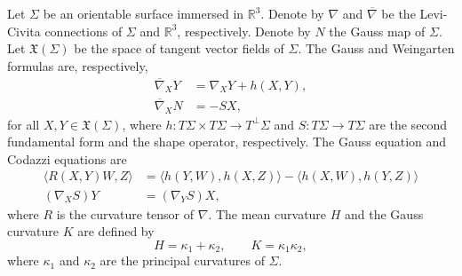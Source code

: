 \documentclass[a4paper,12pt]{amsart}
\theoremstyle{definition}
\def\r{\mathbb R}
\begin{document}
Let $\Sigma$ be an orientable surface immersed in $\r^3$. Denote by  $\nabla$ and $\overline{\nabla}$ be the Levi-Civita connections of $\Sigma$ and
$\mathbb{R}^3$, respectively.  Denote by $N$ the Gauss map of $\Sigma$. Let $\mathfrak{X}(\Sigma)$ be the space of tangent vector fields of $\Sigma$. The  Gauss and Weingarten formulas are, respectively, 
\begin{equation}\label{gw}  
\begin{split}
    \overline{\nabla}_XY&=\nabla_XY+h(X,Y), \\
    \overline{\nabla}_XN&=-SX,
    \end{split}
\end{equation}
for all $X,Y\in\mathfrak{X}(\Sigma)$, where $h\colon T\Sigma\times T\Sigma\to T^\perp\Sigma$ and  $S\colon T\Sigma\to  T\Sigma$ are the second fundamental form and the shape
operator, respectively. The  Gauss
equation and Codazzi equations are 
\begin{equation*}
\begin{split}
    \langle R(X,Y)W,Z\rangle&=\langle h(Y,W),h(X,Z)\rangle-\langle
    h(X,W),h(Y,Z)\rangle\\
    (\nabla_XS)Y&=(\nabla_YS)X,
    \end{split}
\end{equation*}
where $R$ is the curvature tensor of $\nabla$. The   mean curvature  $H$ and the Gauss curvature $K$ are defined by
\[   H=\kappa_1+\kappa_2,\qquad K=\kappa_1\kappa_2,\]
where  $\kappa_1$ and $\kappa_2$ are the principal curvatures of $\Sigma$. 
\end{document}
